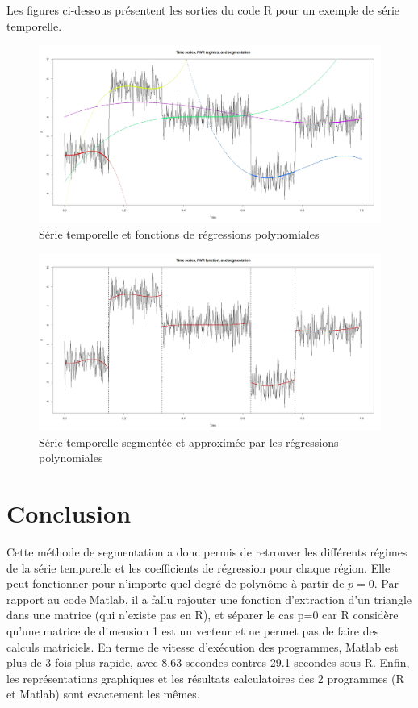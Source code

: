 \documentclass[12pt]{article}
\begin{document}
Les figures ci-dessous présentent les sorties du code R pour un exemple de série temporelle.
\smallbreak
\begin{figure}[H] 
\centering
\includegraphics[scale=.25]{segmentation1.jpeg}
\caption{\label{fig: segmentation1} Série temporelle et fonctions de régressions polynomiales}
\end{figure}

\begin{figure}[H] 
\centering
\includegraphics[scale=.25]{segmentation.jpeg}
\caption{\label{fig: segmentation2} Série temporelle segmentée et approximée par les régressions polynomiales}
\end{figure} 


\section{Conclusion}
\label{sec:Conclusion}
Cette méthode de segmentation a donc permis de retrouver les différents régimes de la série temporelle et les coefficients de régression pour chaque région. Elle peut fonctionner pour n'importe quel degré de polynôme à partir de $p=0$. Par rapport au code Matlab, il a fallu rajouter une fonction d'extraction d'un triangle dans une matrice (qui n'existe pas en R), et séparer le cas p=0 car R considère qu'une matrice de dimension 1 est un vecteur et ne permet pas de faire des calculs matriciels. En terme de vitesse d'exécution des programmes, Matlab est plus de 3 fois plus rapide, avec 8.63 secondes contres 29.1 secondes sous R. Enfin, les représentations graphiques et les résultats calculatoires des 2 programmes (R et Matlab) sont exactement les mêmes.


\newpage


\end{document}
